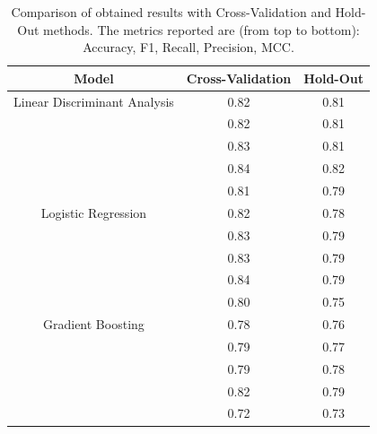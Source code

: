             \begin{table}[htbp]
                \centering
                \caption{Comparison of obtained results with Cross-Validation and Hold-Out methods. The metrics reported are (from top to bottom): Accuracy, F1, Recall, Precision, MCC.}
                \label{tab:feature_engineering_approach_holdout}
                \begin{tabular}{|c|c|c|}
                \hline
                \textbf{Model} & \textbf{Cross-Validation} & \textbf{Hold-Out} \\ \hline
                    Linear Discriminant Analysis    & 0.82 & 0.81 \\ 
                                                    & 0.82 & 0.81 \\ 
                                                    & 0.83 & 0.81 \\ 
                                                    & 0.84 & 0.82 \\
                                                    & 0.81 & 0.79 \\ 
                                                    \hline
                    Logistic Regression             & 0.82 & 0.78 \\ 
                                                    & 0.83 & 0.79 \\ 
                                                    & 0.83 & 0.79 \\ 
                                                    & 0.84 & 0.79 \\
                                                    & 0.80 & 0.75 \\
                                                    \hline
                    Gradient Boosting               & 0.78 & 0.76 \\ 
                                                    & 0.79 & 0.77 \\ 
                                                    & 0.79 & 0.78 \\
                                                    & 0.82 & 0.79 \\ 
                                                    & 0.72 & 0.73 \\ 
                                                    \hline
                \end{tabular}
            \end{table}

            \newpage

